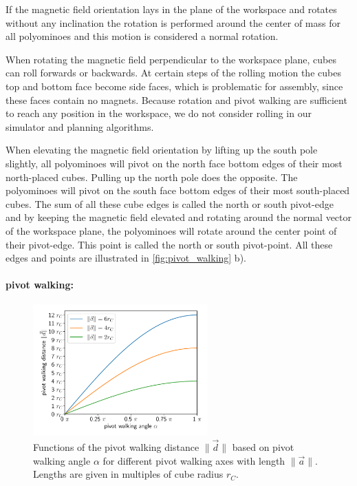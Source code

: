 If the magnetic field orientation lays in the plane of the workspace and rotates without any inclination the rotation is performed around the center of mass for all polyominoes and this motion is considered a normal rotation.

When rotating the magnetic field perpendicular to the workspace plane, cubes can roll forwards or backwards.
At certain steps of the rolling motion the cubes top and bottom face become side faces, which is problematic for assembly, since these faces contain no magnets.
Because rotation and pivot walking are sufficient to reach any position in the workspace, we do not consider rolling in our simulator and planning algorithms.

When elevating the magnetic field orientation by lifting up the south pole slightly, all polyominoes will pivot on the north face bottom edges of their most north-placed cubes.
Pulling up the north pole does the opposite. The polyominoes will pivot on the south face bottom edges of their most south-placed cubes.
The sum of all these cube edges is called the north or south pivot-edge and by keeping the magnetic field elevated and rotating around the normal vector of the workspace plane, the polyominoes will rotate around the center point of their pivot-edge.
This point is called the north or south pivot-point.
All these edges and points are illustrated in \autoref{fig:pivot_walking} b).


\paragraph{pivot walking:}

\begin{figure}
	\centering
	\includegraphics[width=0.60\textwidth]{figures/plots/pivot_walking_angle.pdf}
	\caption[Functions of $\lVert \vec{d} \rVert$ based on $\alpha$ for different $\lVert \vec{a} \rVert$]{Functions of the pivot walking distance $\lVert \vec{d} \rVert$ based on pivot walking angle $\alpha$ for different pivot walking axes with length $\lVert \vec{a} \rVert$. Lengths are given in multiples of cube radius $r_C$.}
	\label{fig:pw_angle_plot}
\end{figure}

